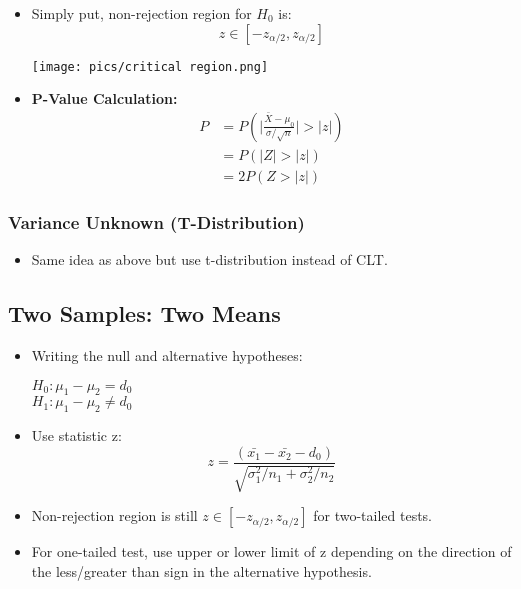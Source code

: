 \documentclass[10pt, letterpaper, twoside]{article}
\newenvironment{Figure}
  {\par\medskip\noindent\minipage{\linewidth}}
  {\endminipage\par\medskip}
\begin{document}
\begin{multicols}{2}
\begin{itemize}
    \item Simply put, non-rejection region for $H_0$ is:
    \begin{equation*}
        z \in [-z_{\alpha/2}, z_{\alpha/2}]
    \end{equation*}
    \begin{Figure}
        \texttt{[image: pics/critical region.png]}
    \end{Figure}
    \item \textbf{P-Value Calculation:}
    \begin{align*}
        P &= P(\Big|\frac{\bar{X}-\mu_0}{\sigma/\sqrt{n}}\Big| > |z|) \\
        &= P(|Z| > |z|)\\
        &= 2P(Z > |z|)
    \end{align*}
\end{itemize}

\subsubsection{Variance Unknown (T-Distribution)}
\begin{itemize}
    \item Same idea as above but use t-distribution instead of CLT.
\end{itemize}

\subsection{Two Samples: Two Means}

\begin{itemize}
    \item Writing the null and alternative hypotheses:
    \begin{center}
        $H_0: \mu_1 - \mu_2 = d_0$\\
        $H_1: \mu_1 - \mu_2 \neq d_0$
    \end{center}
    \item Use statistic z:
    \begin{equation*}
        z = \frac{(\bar{x_1} - \bar{x_2} - d_0)}{\sqrt{\sigma_1^2/n_1 + \sigma_2^2/n_2}}
    \end{equation*}
    \item Non-rejection region is still $z \in [-z_{\alpha/2}, z_{\alpha/2}]$ for two-tailed tests.
    \item For one-tailed test, use upper or lower limit of z depending on the direction of the less/greater than sign in the alternative hypothesis.
\end{itemize}


\end{multicols}
\end{document}
